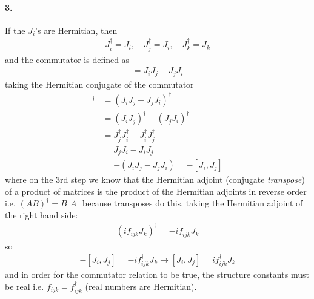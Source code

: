 \documentclass[../main.tex]{subfiles}
\begin{document}
\paragraph*{3.} If the $J_i$'s are Hermitian, then
\begin{align*}
    J_i^\dagger = J_i, \quad J_j^\dagger= J_i, \quad J_k^\dagger = J_k
\end{align*}
and the commutator is defined as
\begin{align*}
    [J_i, J_j] = J_i J_j - J_j J_i
\end{align*}
taking the Hermitian conjugate of the commutator
\begin{align*}
    [J_i, J_j]^\dagger &= (J_i J_j - J_j J_i)^\dagger \\
    &= (J_i J_j)^\dagger - (J_j J_i)^\dagger \\
    &= J_j^\dagger J_i^\dagger - J_i^\dagger J_j^\dagger \\
    &= J_j J_i - J_i J_j \\
    &= -(J_i J_j - J_j J_i) = -[J_i, J_j]
\end{align*}
where on the 3rd step we know that the Hermitian adjoint (conjugate \emph{transpose}) of a product of
matrices is the product of the Hermitian adjoints in reverse order i.e.
$(AB)^\dagger = B^\dagger A^\dagger$ because transposes do this. taking the Hermitian adjoint of the
right hand side:
\begin{align*}
    (if_{ijk} J_k)^\dagger = -i f_{ijk}^\dagger J_k
\end{align*}
so
\begin{align*}
    -[J_i, J_j] = -i f_{ijk}^\dagger J_k \to [J_i, J_j] = i f_{ijk}^\dagger J_k
\end{align*}
and in order for the commutator relation to be true, the structure constants must be real i.e.
$f_{ijk} = f_{ijk}^\dagger$ (real numbers are Hermitian).
\end{document}

